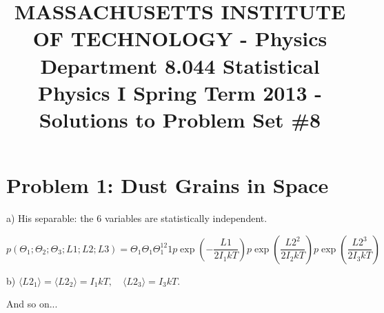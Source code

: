 \documentclass{article}
\title{MASSACHUSETTS INSTITUTE OF TECHNOLOGY - Physics Department 8.044 Statistical Physics I Spring Term 2013 - Solutions to Problem Set \#8}
\begin{document}
\maketitle

\section*{Problem 1: Dust Grains in Space}

\noindent a) His separable: the 6 variables are statistically independent.

\[
p(\Theta_1;\Theta_2;\Theta_3;L1;L2;L3) = \Theta_1\Theta_1\Theta_1^{12} 1p \exp\left(-\frac{L1}{2I_1 kT}\right) p \exp\left(\frac{L2^2}{2I_2 kT}\right) p \exp\left(\frac{L2^3}{2I_3 kT}\right)
\]

\noindent b) $\langle L2_1 \rangle = \langle L2_2 \rangle = I_1kT, \quad \langle L2_3 \rangle = I_3kT.$

\noindent And so on...
\end{document}
